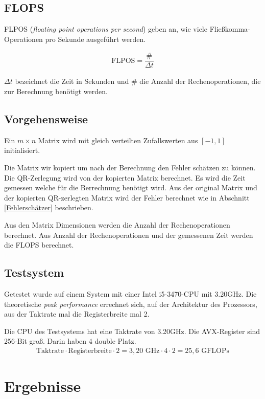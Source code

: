 \subsection{FLOPS}
FLPOS (\textit{floating point operations per second}) geben an, wie viele Fließkomma-Operationen pro Sekunde ausgeführt werden.

\begin{align*}
  \text{FLPOS} = \dfrac{\#}{\Delta t}
\end{align*}

$\Delta t$ bezeichnet die Zeit in Sekunden und $\#$ die Anzahl der Rechenoperationen, die zur Berechnung benötigt werden.

\subsection{Vorgehensweise}

Ein $m \times n$ Matrix wird mit gleich verteilten Zufallswerten aus $[-1,1]$ initialisiert.

Die Matrix wir kopiert um nach der Berechnung den Fehler schätzen zu können. Die QR-Zerlegung wird von der kopierten Matrix berechnet. Es wird die Zeit gemessen welche für die Berrechnung benötigt wird. 
Aus der original Matrix und der kopierten QR-zerlegten Matrix wird der Fehler berechnet wie in Abschnitt \ref{Fehlerschätzer} beschrieben.

Aus den Matrix Dimensionen werden die Anzahl der Rechenoperationen berechnet. 
Aus Anzahl der Rechenoperationen und der gemessenen Zeit werden die FLOPS berechnet.


\subsection{Testsystem}

Getestet wurde auf einem System mit einer Intel i5-3470-CPU mit 3.20GHz. 
Die theoretische \textit{peak performance} errechnet sich, auf der Architektur des Prozessors, aus der Taktrate mal die Registerbreite mal 2. 

Die CPU des Testsystems hat eine Taktrate von 3.20GHz.
Die AVX-Register sind 256-Bit groß. Darin haben 4 double Platz.
\begin{align*}
  \text{Taktrate} \cdot \text{Registerbreite} \cdot 2= 3,20 \text{ GHz} \cdot 4 \cdot 2 = 25,6 \text{ GFLOPs}
\end{align*}

\section{Ergebnisse}
